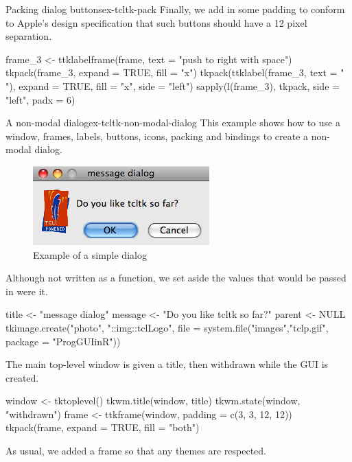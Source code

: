 \begin{example}{Packing dialog buttons}{ex-tcltk-pack}
Finally, we add in some padding to conform to Apple's design specification that such
buttons should have a 12 pixel separation.
\begin{Schunk}
\begin{Sinput}
 frame_3 <- ttklabelframe(frame, text = "push to right with space")
 tkpack(frame_3, expand = TRUE, fill = "x")
 tkpack(ttklabel(frame_3, text = " "), expand = TRUE, fill = "x", 
        side = "left")
 sapply(l(frame_3), tkpack, side = "left", padx = 6)
\end{Sinput}
\end{Schunk}
\end{example}

\begin{example}{A non-modal dialog}{ex-tcltk-non-modal-dialog}
This example shows how to use  a window, frames,  labels, buttons,
icons, packing and bindings to create a non-modal dialog. 

\begin{figure}
  \centering
  \includegraphics[width=.4\textwidth]{fig-tcltk-simple-dialog.png}
  \caption{Example of a simple dialog}
  \label{fig:fig-tcltk-simple-dialog}
\end{figure}

Although not written as a function, we set aside the values that would
be passed in were it.
\begin{Schunk}
\begin{Sinput}
 title <- "message dialog"
 message <- "Do you like tcltk so far?"
 parent <- NULL
 tkimage.create("photo", "::img::tclLogo", 
                file = system.file("images","tclp.gif",
                  package = "ProgGUIinR"))
\end{Sinput}
\end{Schunk}

The main top-level window is given a title, then withdrawn while
the GUI is created. 
\begin{Schunk}
\begin{Sinput}
 window <- tktoplevel()
 tkwm.title(window, title)
 tkwm.state(window, "withdrawn")
 frame <- ttkframe(window,  padding = c(3, 3, 12, 12))
 tkpack(frame, expand = TRUE, fill = "both")
\end{Sinput}
\end{Schunk}
As usual, we added a frame so that any themes are respected.


\end{example}
